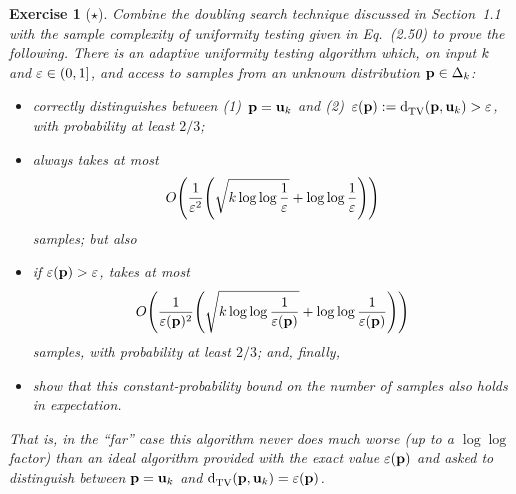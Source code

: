 \documentclass[biber,plain]{nowfnt} %
\newtheorem{question}{Exercise}[chapter]
\begin{document}
\begin{question}[$\star$]\label{ex:unif:adaptive}
Combine the doubling search technique discussed in Section~1.1 with the sample complexity of uniformity testing given in Eq.~(2.50) to prove the following. There is an adaptive uniformity testing algorithm which, on input $k$ and $\varepsilon\in(0,1]$, and access to samples from an unknown distribution $\mathbf{p}\in\Delta_{k}$:
\begin{itemize}
  \item correctly distinguishes between (1)~$\mathbf{p}=\mathbf{u}_k$ and (2)~$\dst(\p)\eqdef \totalvardist{\p}{\uniform_\ab} > \dst$, with probability at least $2/3$;
  \item always takes at most 
    \[
      \bigO{\frac{1}{\dst^2}\Paren{\sqrt{\ab \log \log \frac{1}{\dst} } + \log \log \frac{1}{\dst} }}
    \] samples; but also
  \item if $\varepsilon(\mathbf{p}) > \varepsilon$, takes at most
    \[
      \bigO{\frac{1}{\dst(\p)^2}\Paren{\sqrt{\ab \log \log \frac{1}{\dst(\p)} } + \log \log \frac{1}{\dst(\p)} }}
    \] samples, with probability at least $2/3$; and, finally,
  \item show that this constant-probability bound on the number of samples also holds \emph{in expectation.}
\end{itemize}
That is, in the ``far'' case this algorithm never does much worse (up to a $\log\log$ factor) than an ideal algorithm provided with the exact value $\varepsilon(\mathbf{p})$ and asked to distinguish between $\mathbf{p}=\mathbf{u}_k$ and $\totalvardist{\p}{\uniform_\ab} = \dst(\p)$.
\end{question}
\end{document}
